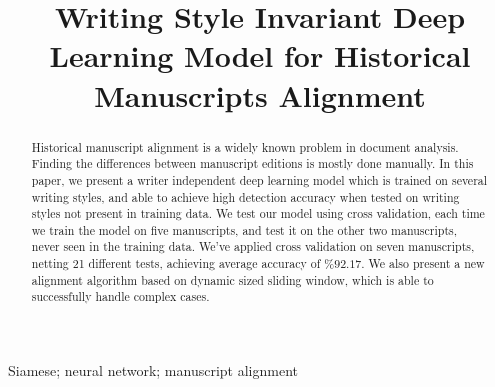 \documentclass[10pt, a4paper, conference, compsocconf]{IEEEtran}
\begin{document}
\title{Writing Style Invariant Deep Learning Model for Historical Manuscripts Alignment}




\author{
	\and
	
	\and
	}

\maketitle


\begin{abstract}
	Historical manuscript alignment is a widely known problem in document analysis. Finding the differences between manuscript editions is mostly done manually. In this paper, we present a writer independent deep learning model which is trained on several writing styles, and able to achieve high detection accuracy when tested on writing styles not present in training data. We test our model using cross validation, each time we train the model on five manuscripts, and test it on the other two manuscripts, never seen in the training data. We've applied cross validation on seven manuscripts, netting 21 different tests, achieving average accuracy of $\%92.17$. We also present a new alignment algorithm based on dynamic sized sliding window, which is able to successfully handle complex cases.
\end{abstract}


\begin{IEEEkeywords}
Siamese; neural network; manuscript alignment

\end{IEEEkeywords}


\IEEEpeerreviewmaketitle
\end{document}
